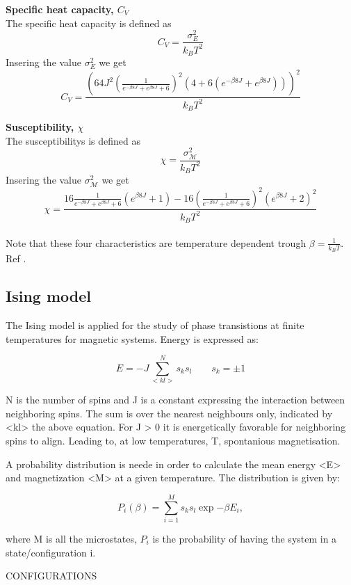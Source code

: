 \documentclass[../main.tex]{subfiles}
\begin{document}
    \textbf{Specific heat capacity, $C_V$}\\
    The specific heat capacity is defined as
    \[C_V = \frac{\sigma_E^2}{k_B T^2}\]
    Insering the value $\sigma^2_E$ we get
      \[C_V = \frac{\left( 64J^2 \left(\frac{1}{e^{-\beta 8J} + e^{\beta 8J} + 6}\right)^2  \left(4 + 6(e^{-\beta 8J} + e^{\beta 8J}) \right)\right)^2}{k_B T^2}\]


    \textbf{Susceptibility, $\chi$}\\
    The susceptibilitys is defined as
    \[\chi = \frac{\sigma^2_\mathcal{M}}{k_B T^2}\]
    Insering the value $\sigma^2_\mathcal{M}$ we get
    \[\chi = \frac{16 \frac{1}{e^{-\beta 8J} + e^{\beta 8J} + 6} \left(e^{\beta 8J} + 1\right)- 16\left(\frac{1}{e^{-\beta 8J} + e^{\beta 8J} + 6}\right)^2\left( e^{\beta 8J} +2 \right)^2}{k_B T^2}\]\\

    \noindent Note that these four characteristics are temperature dependent trough $\beta = \frac{1}{k_B T}$.\\
    Ref \cite{Mortenstatphys2019}.


    \subsection{Ising model}
    The Ising model is applied for the study of phase transistions at finite temperatures
    for magnetic systems. Energy is expressed as:

    \begin{equation}
      E = -J \sum  _{<kl>}^N s_ks_l \qquad s_k = \pm 1
    \end{equation}

    N is the number of spins and J is a constant expressing the interaction between neighboring spins. The sum is over the nearest neighbours only, indicated by <kl> the above equation. For J > 0 it is energetically favorable for neighboring spins to align. Leading to, at low temperatures, T, spontanious magnetisation.

    A probability distribution is neede in order to calculate the mean energy <E> and magnetization <M> at a given temperature. The distribution is given by:

    \begin{equation}
      P_i(\beta)=  \sum  _{i = 1}^M s_ks_l \exp{-\beta E_i},
    \end{equation}

    where M is all the microstates, $P_i$ is the probability of having the system in a state/configuration i.

    CONFIGURATIONS
\end{document}
